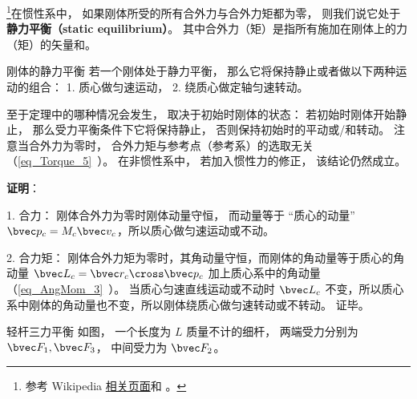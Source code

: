 

\footnote{参考 Wikipedia \href{https://en.wikipedia.org/wiki/Mechanical_equilibrium}{相关页面}和 \cite{新力}。}在惯性系中， 如果刚体所受的所有合外力与合外力矩都为零， 则我们说它处于\textbf{静力平衡（static equilibrium）}。 其中合外力（矩）是指所有施加在刚体上的力（矩）的矢量和。

\begin{theorem}{刚体的静力平衡}
若一个刚体处于静力平衡， 那么它将保持静止或者做以下两种运动的组合： 1. 质心做匀速运动， 2. 绕质心做定轴匀速转动。
\end{theorem}
至于定理中的哪种情况会发生， 取决于初始时刚体的状态： 若初始时刚体开始静止， 那么受力平衡条件下它将保持静止， 否则保持初始时的平动或/和转动。 注意当合外力为零时， 合外力矩与参考点（参考系）的选取无关（\autoref{eq_Torque_5}~）。 在非惯性系中， 若加入惯性力的修正， 该结论仍然成立。 

\textbf{证明}：

1. 合力： 刚体合外力为零时刚体动量守恒， 而动量等于 “质心的动量” 
$\bvec p_c = M_c \bvec v_c$，所以质心做匀速运动或不动。

2. 合力矩： 刚体合外力矩为零时，其角动量守恒，而刚体的角动量等于质心的角动量 $\bvec L_c =\bvec r_c\cross \bvec p_c$ 加上质心系中的角动量（\autoref{eq_AngMom_3}~）。 当质心匀速直线运动或不动时 $\bvec L_c$ 不变，所以质心系中刚体的角动量也不变，所以刚体绕质心做匀速转动或不转动。 证毕。

\begin{example}{轻杆三力平衡}
如图， 一个长度为 $L$ 质量不计的细杆， 两端受力分别为 $\bvec F_1, \bvec F_3$， 中间受力为 $\bvec F_2$。
\end{example}



